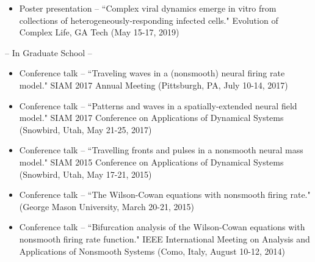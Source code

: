 \documentclass[a4paper,10pt]{article}
\newlength{\cvcolumngapwidth}
\newlength{\cvleftcolumnwidth}
\newlength{\cvrightcolumnwidth}
\newcommand{\cvdurationstyle}[1]{{\small\cvdurationfont\textcolor{cvdurationcolor}{#1}}}
\newlength{\cvafteritemskipamount}
\newlength{\cvparskip}
\newcommand{\cvitem}[2]{
            \begin{minipage}[t]{\cvleftcolumnwidth}
                \raggedleft #1
            \end{minipage}%
            \hspace{\cvcolumngapwidth}%
            \begin{minipage}[t]{\cvrightcolumnwidth}
                \setlength{\parskip}{\cvparskip} #2
            \end{minipage}
        
            \vspace{\cvafteritemskipamount}
        }
\begin{document}
                        \cvitem{
            \cvdurationstyle{}
        }{	
                	        \begin{itemize}[leftmargin=*] 
	                                \item Poster presentation -- ``Complex viral dynamics emerge in vitro from collections of heterogeneously-responding infected cells." Evolution of Complex Life, GA Tech (May 15-17, 2019)  \\

            \end{itemize}
            
            
            -- In Graduate School --
            \begin{itemize}[leftmargin=*] 
            	\item Conference talk -- ``Traveling waves in a (nonsmooth) neural firing rate model." SIAM 2017 Annual Meeting (Pittsburgh, PA, July 10-14, 2017)
        	\item Conference talk -- ``Patterns and waves in a spatially-extended neural field model." SIAM 2017 Conference on Applications of Dynamical Systems \\(Snowbird, Utah, May 21-25, 2017)
            	\item Conference talk -- ``Travelling fronts and pulses in a nonsmooth neural mass model." SIAM 2015 Conference on Applications of Dynamical Systems \\(Snowbird, Utah, May 17-21, 2015)
        	\item Conference talk -- ``The Wilson-Cowan equations with nonsmooth firing rate." (George Mason University, March 20-21, 2015)
        	\item Conference talk --  ``Bifurcation analysis of the Wilson-Cowan equations with nonsmooth firing rate function." IEEE International Meeting on Analysis and Applications of Nonsmooth Systems (Como, Italy, August 10-12, 2014)
            \end{itemize}
        }
        
\end{document}

